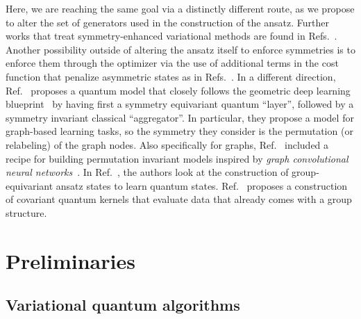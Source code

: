 \documentclass[a4paper,twocolumn,notitlepage,nofootinbib,superscriptaddress,floatfix]{revtex4-2}
\begin{document}
Here, we are reaching the same goal via a distinctly different route, as we propose to alter the set of generators used in the construction of the ansatz. Further works that treat symmetry-enhanced variational methods are found in Refs.~\cite{selvarajan2022variational,lyu2022symmetry,ParkBrokenSymm}. Another possibility outside of altering the ansatz itself to enforce symmetries is to enforce them through the optimizer via the use of additional terms in the cost function that penalize asymmetric states as in Refs.~\cite{bookatz2015error,ryabinkin2018symmetry,kuroiwa2021penalty}.
In a different direction, Ref.~\cite{mernyei2021equivariant} proposes a quantum model that closely follows the geometric deep learning blueprint~\cite{bronstein2021geometric} by having first a symmetry equivariant quantum \enquote{layer}, followed by a symmetry invariant classical \enquote{aggregator}.
In particular, they propose a model for graph-based learning tasks, so the symmetry they consider is the permutation (or relabeling) of the graph nodes.
Also specifically for graphs, Ref.~\cite{verdon2019quantum} included a recipe for building permutation invariant models inspired by \emph{graph convolutional neural networks}~\cite{bronstein2021geometric}. In Ref.~\cite{zheng2021speeding}, the authors look at the construction of group-equivariant ansatz states to learn quantum states. 
Ref.~\cite{glick2022covariant} proposes a construction of covariant quantum kernels that evaluate data that already comes with a group structure.

\section{Preliminaries}\label{sec:preliminaries}

\subsection*{Variational quantum algorithms}
\end{document}
